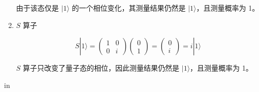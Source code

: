 \documentclass[11pt]{article}
\begin{document}
\begin{enumerate}
    由于该态仅是 \( |1\rangle \) 的一个相位变化，其测量结果仍然是 \( |1\rangle \)，且测量概率为 1。

    \item \( S \) 算子

    \[
    S |1\rangle = \begin{pmatrix} 1 & 0 \\ 0 & i \end{pmatrix} \begin{pmatrix} 0 \\ 1 \end{pmatrix} = \begin{pmatrix} 0 \\ i \end{pmatrix} = i |1\rangle
    \]

\( S \) 算子只改变了量子态的相位，因此测量结果仍然是 \( |1\rangle \)，且测量概率为 1。

\end{enumerate}
 in
\end{document}
